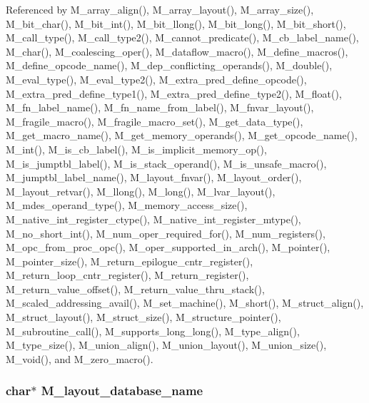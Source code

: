 Referenced by M\_\-array\_\-align(), M\_\-array\_\-layout(), M\_\-array\_\-size(), M\_\-bit\_\-char(), M\_\-bit\_\-int(), M\_\-bit\_\-llong(), M\_\-bit\_\-long(), M\_\-bit\_\-short(), M\_\-call\_\-type(), M\_\-call\_\-type2(), M\_\-cannot\_\-predicate(), M\_\-cb\_\-label\_\-name(), M\_\-char(), M\_\-coalescing\_\-oper(), M\_\-dataflow\_\-macro(), M\_\-define\_\-macros(), M\_\-define\_\-opcode\_\-name(), M\_\-dep\_\-conflicting\_\-operands(), M\_\-double(), M\_\-eval\_\-type(), M\_\-eval\_\-type2(), M\_\-extra\_\-pred\_\-define\_\-opcode(), M\_\-extra\_\-pred\_\-define\_\-type1(), M\_\-extra\_\-pred\_\-define\_\-type2(), M\_\-float(), M\_\-fn\_\-label\_\-name(), M\_\-fn\_\-name\_\-from\_\-label(), M\_\-fnvar\_\-layout(), M\_\-fragile\_\-macro(), M\_\-fragile\_\-macro\_\-set(), M\_\-get\_\-data\_\-type(), M\_\-get\_\-macro\_\-name(), M\_\-get\_\-memory\_\-operands(), M\_\-get\_\-opcode\_\-name(), M\_\-int(), M\_\-is\_\-cb\_\-label(), M\_\-is\_\-implicit\_\-memory\_\-op(), M\_\-is\_\-jumptbl\_\-label(), M\_\-is\_\-stack\_\-operand(), M\_\-is\_\-unsafe\_\-macro(), M\_\-jumptbl\_\-label\_\-name(), M\_\-layout\_\-fnvar(), M\_\-layout\_\-order(), M\_\-layout\_\-retvar(), M\_\-llong(), M\_\-long(), M\_\-lvar\_\-layout(), M\_\-mdes\_\-operand\_\-type(), M\_\-memory\_\-access\_\-size(), M\_\-native\_\-int\_\-register\_\-ctype(), M\_\-native\_\-int\_\-register\_\-mtype(), M\_\-no\_\-short\_\-int(), M\_\-num\_\-oper\_\-required\_\-for(), M\_\-num\_\-registers(), M\_\-opc\_\-from\_\-proc\_\-opc(), M\_\-oper\_\-supported\_\-in\_\-arch(), M\_\-pointer(), M\_\-pointer\_\-size(), M\_\-return\_\-epilogue\_\-cntr\_\-register(), M\_\-return\_\-loop\_\-cntr\_\-register(), M\_\-return\_\-register(), M\_\-return\_\-value\_\-offset(), M\_\-return\_\-value\_\-thru\_\-stack(), M\_\-scaled\_\-addressing\_\-avail(), M\_\-set\_\-machine(), M\_\-short(), M\_\-struct\_\-align(), M\_\-struct\_\-layout(), M\_\-struct\_\-size(), M\_\-structure\_\-pointer(), M\_\-subroutine\_\-call(), M\_\-supports\_\-long\_\-long(), M\_\-type\_\-align(), M\_\-type\_\-size(), M\_\-union\_\-align(), M\_\-union\_\-layout(), M\_\-union\_\-size(), M\_\-void(), and M\_\-zero\_\-macro().
\subsubsection{\setlength{\rightskip}{0pt plus 5cm}char$\ast$ \bf{M\_\-layout\_\-database\_\-name}}\label{m__spec_8h_987ac68163669d5fcd111ec0a848e5cd}




